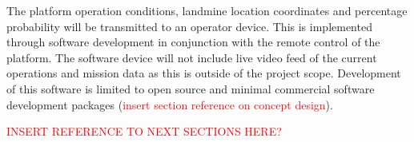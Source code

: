\documentclass[main.tex]{subfiles}
\begin{document}
The platform operation conditions, landmine location coordinates and percentage probability will be transmitted to an operator device. This is implemented through software development in conjunction with the remote control of the platform. The software device will not include live video feed of the current operations and mission data as this is outside of the project scope. Development of this software is limited to open source and minimal commercial software development packages (\textcolor{red}{insert section reference on concept design}).%

\textcolor{red}{INSERT REFERENCE TO NEXT SECTIONS HERE?}
 
\end{document}
